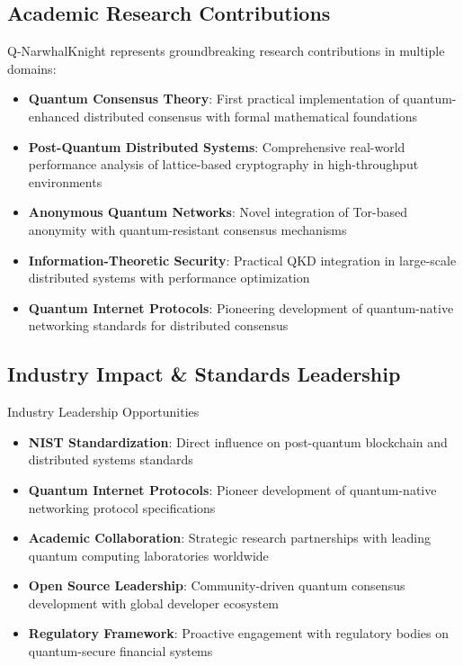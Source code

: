 \documentclass[11pt,a4paper]{article}
\begin{document}
\subsection{Academic Research Contributions}

Q-NarwhalKnight represents groundbreaking research contributions in multiple domains:

\begin{itemize}
\item \textbf{Quantum Consensus Theory}: First practical implementation of quantum-enhanced distributed consensus with formal mathematical foundations
\item \textbf{Post-Quantum Distributed Systems}: Comprehensive real-world performance analysis of lattice-based cryptography in high-throughput environments
\item \textbf{Anonymous Quantum Networks}: Novel integration of Tor-based anonymity with quantum-resistant consensus mechanisms
\item \textbf{Information-Theoretic Security}: Practical QKD integration in large-scale distributed systems with performance optimization
\item \textbf{Quantum Internet Protocols}: Pioneering development of quantum-native networking standards for distributed consensus
\end{itemize}

\subsection{Industry Impact \& Standards Leadership}

\begin{achievementbox}{Industry Leadership Opportunities}
\begin{itemize}
\item \textbf{NIST Standardization}: Direct influence on post-quantum blockchain and distributed systems standards
\item \textbf{Quantum Internet Protocols}: Pioneer development of quantum-native networking protocol specifications
\item \textbf{Academic Collaboration}: Strategic research partnerships with leading quantum computing laboratories worldwide
\item \textbf{Open Source Leadership}: Community-driven quantum consensus development with global developer ecosystem
\item \textbf{Regulatory Framework}: Proactive engagement with regulatory bodies on quantum-secure financial systems
\end{itemize}
\end{achievementbox}
\end{document}

